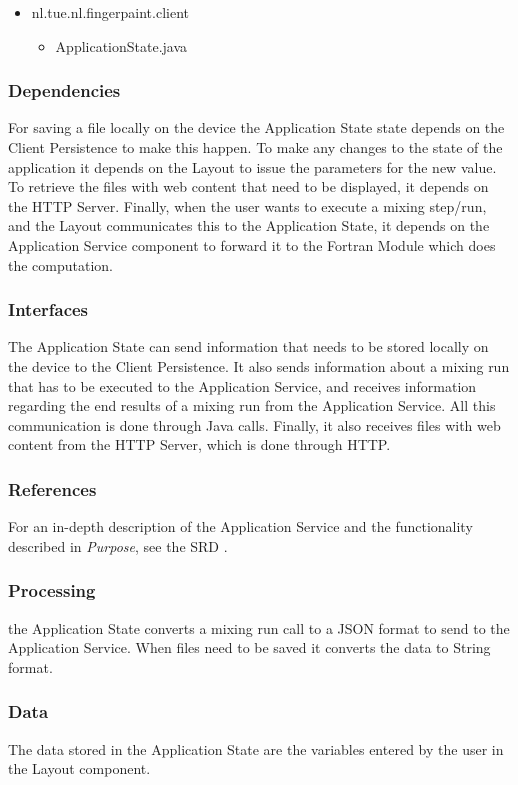 \fpstartparagraph{} \begin{itemize}
	\item nl.tue.nl.fingerpaint.client
	\begin{itemize}
		\item ApplicationState.java
	\end{itemize}
\end{itemize}

\subsubsection*{Dependencies}
For saving a file locally on the device the Application State state depends on the Client Persistence to make this happen. To make any changes to the state of the application it depends on the Layout to issue the parameters for the new value. To retrieve the files with web content that need to be displayed, it depends on the HTTP Server. Finally, when the user wants to execute a mixing step/run, and the Layout communicates this to the Application State, it depends on the Application Service component to forward it to the Fortran Module which does the computation.

\subsubsection*{Interfaces}
The Application State can send information that needs to be stored locally on the device to the Client Persistence. It also sends information about a mixing run that has to be executed to the Application Service, and receives information regarding the end results of a mixing run from the Application Service. All this communication is done through Java calls. Finally, it also receives files with web content from the HTTP Server, which is done through HTTP.

\subsubsection*{References}
For an in-depth description of the Application Service and the functionality described in \emph{Purpose}, see the SRD \cite{srd}.

\subsubsection*{Processing}
the Application State converts a mixing run call to a JSON format to send to the Application Service. When files need to be saved it converts the data to String format.

\subsubsection*{Data}
The data stored in the Application State are the variables entered by the user in the Layout component.
